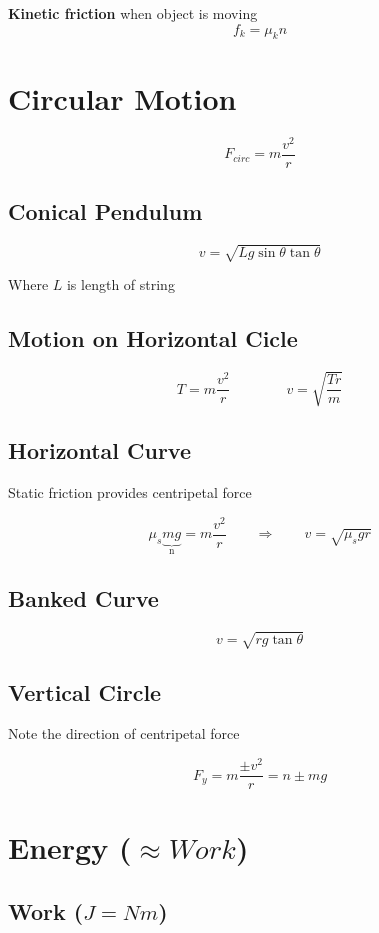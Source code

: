 \documentclass[12pt, twocolumn]{article}
\begin{document}
\begin{spacing}{1.5}
\textbf{Kinetic friction} when object is moving
$$f_k = \mu_k n$$

\section{Circular Motion}

$$F_{circ} = m \frac{v^2}{r}$$

\subsection{Conical Pendulum}

$$v = \sqrt{Lg \sin{\theta} \tan{\theta}}$$

Where $L$ is length of string

\subsection{Motion on Horizontal Cicle}

$$T = m \frac{v^2}{r} \qquad \qquad 
v = \sqrt{\frac{Tr}{m}}$$

\subsection{Horizontal Curve}

Static friction provides centripetal force

$$\mu_s \underbrace{m g}_{\text{n}} = m \frac{v^2}{r} \qquad \Rightarrow \qquad 
v = \sqrt{\mu_s gr}$$ 

\subsection{Banked Curve}

$$v = \sqrt{rg \tan{\theta}}$$

\subsection{Vertical Circle}

Note the direction of centripetal force

$$F_y = m \frac{\pm v^2}{r} = n \pm mg$$

\section{Energy ($\approx Work$)}

\subsection{Work ($J = Nm$)}


\end{spacing}
\end{document}
